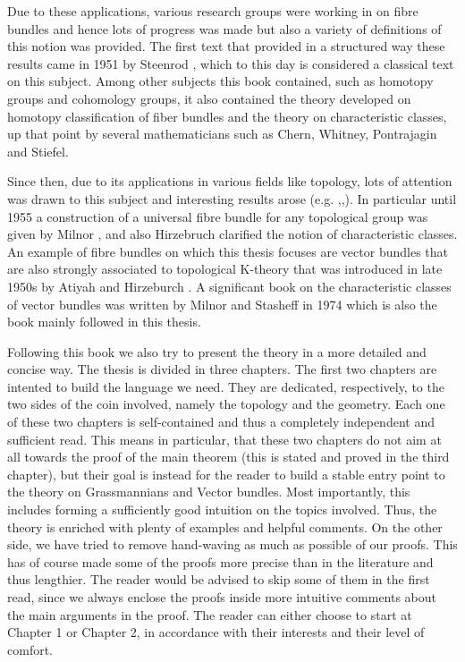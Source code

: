Due to these applications, various research groups were working in on fibre bundles and hence lots of progress was made but also a variety of definitions of this notion was provided.
The first text that provided in a structured way these results came in 1951 by Steenrod \cite{steenrod1951topology}, which to this day is considered a classical text on this subject.
Among other subjects this book contained, such as homotopy groups and cohomology groups, it also contained the theory developed on homotopy classification of fiber bundles and the theory on characteristic classes, up that point by several mathematicians such as Chern, Whitney, Pontrajagin and Stiefel.

Since then, due to its applications in various fields like topology, lots of attention was drawn to this subject and interesting results arose (e.g. \cite{thom1952espaces},\cite{borel1955topology},\cite{hirzebruch1956}).
In particular until 1955 a construction of a universal fibre bundle for any topological group was given by Milnor \cite{milnor1956construction}\cite{milnor1956construction2}, and also Hirzebruch clarified the notion of characteristic classes.
An example of fibre bundles on which this thesis focuses are vector bundles that are also strongly associated to topological K-theory that was introduced in late 1950s by Atiyah and Hirzeburch \cite{atiyah1961vector}.
A significant book on the characteristic classes of vector bundles was written by Milnor and Stasheff in 1974 \cite{char_class} which is also the book mainly followed in this thesis.

 Following this book we also try to present the theory in a more detailed and concise way. The thesis is divided in three chapters.
The first two chapters are intented to build the language we need. They are dedicated, respectively, to the two sides of the coin involved, namely the topology and the geometry. Each one of these two chapters is self-contained and thus a completely independent and sufficient read. This means in particular, that these two chapters do not aim at all towards the proof of the main theorem (this is stated and proved in the third chapter), but their goal is instead for the reader to build a stable entry point to the theory on Grassmannians and Vector bundles. Most importantly, this includes forming a sufficiently good intuition on the topics involved. Thus, the theory is enriched with plenty of examples and helpful comments. On the other side, we have tried to remove hand-waving as much as possible of our proofs. This has of course made some of the proofs more precise than in the literature and thus lengthier. The reader would be advised to skip some of them in the first read, since we always enclose the proofs inside more intuitive comments about the main arguments in the proof.
The reader can either choose to start at Chapter 1 or Chapter 2, in accordance with their interests and their level of comfort.


